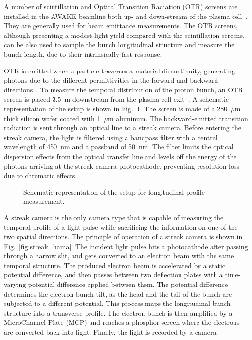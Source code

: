 A number of scintillation and Optical Transition Radiation (OTR) screens are installed in the AWAKE beamline both up- and down-stream of the plasma cell~\cite{Mazzoni:2017gek}. They are generally used for beam emittance measurements. The OTR screens, although presenting a modest light yield compared with the scintillation screens, can be also used to sample the bunch longitudinal structure and measure the bunch length, due to their intrinsically fast response. 

OTR is emitted when a particle traverses a material discontinuity, generating photons due to the different permittivities in the forward and backward directions~\cite{Ginzburg:306834}. To measure the temporal distribution of the proton bunch, an OTR screen is placed 3.5~m downstream from the plasma-cell exit~\cite{Bachmann_streak}. A schematic representation of the setup is shown in Fig.~\ref{fig:OTR_setup}. The screen is made of a 280~$\mu\text{m}$ thick silicon wafer coated with 1~$\mu\text{m}$ aluminum. The backward-emitted transition radiation is sent through an optical line to a streak camera. Before entering the streak camera, the light is filtered using a bandpass filter with a central wavelength of 450~nm and a passband of 50~nm. The filter limits the optical dispersion effects from the optical transfer line and levels off the energy of the photons arriving at the streak camera photocathode, preventing resolution loss due to chromatic effects. 


\begin{figure}[!t]
\centering

\caption{Schematic representation of the setup for longitudinal profile measurement.}
\label{fig:OTR_setup}
\end{figure}


A streak camera is the only camera type that is capable of measuring the temporal profile of a light pulse while sacrificing the information on one of the two spatial directions. The principle of operation of a streak camera is shown in Fig.~\ref{fig:streak_hama}. The incident light pulse hits a photocathode after passing through a narrow slit, and gets converted to an electron beam with the same temporal structure. The produced electron beam is accelerated by a static potential difference, and then passes between two deflection plates with a time-varying potential difference applied between them. The potential difference determines the electron bunch tilt, as the head and the tail of the bunch are subjected to a different potential. This process maps the longitudinal bunch structure into a transverse profile. The electron bunch is then amplified by a MicroChannel Plate (MCP) and reaches a phosphor screen where the electrons are converted back into light. Finally, the light is recorded by a camera.


